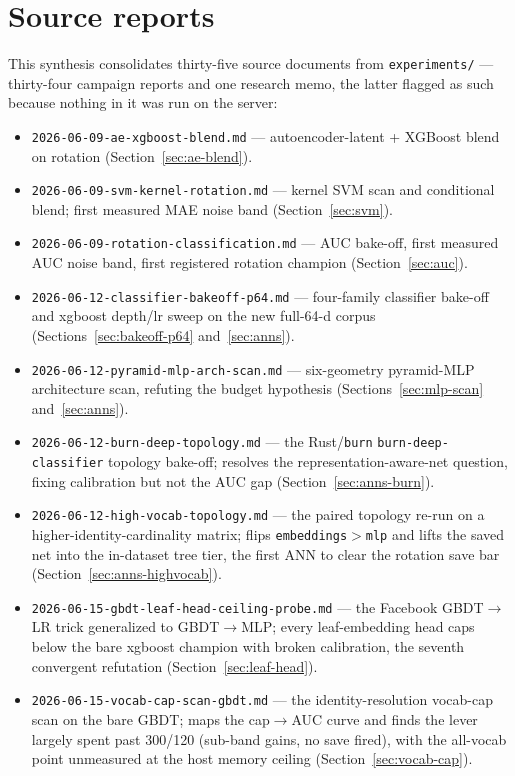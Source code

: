 \documentclass[11pt]{article}
\begin{document}
\section{Source reports}
This synthesis consolidates thirty-five source documents from \texttt{experiments/}
--- thirty-four campaign reports and one research memo, the latter flagged as such
because nothing in it was run on the server:
\begin{itemize}
  \item \texttt{2026-06-09-ae-xgboost-blend.md} --- autoencoder-latent +
    XGBoost blend on rotation (Section~\ref{sec:ae-blend}).
  \item \texttt{2026-06-09-svm-kernel-rotation.md} --- kernel SVM scan and
    conditional blend; first measured MAE noise band (Section~\ref{sec:svm}).
  \item \texttt{2026-06-09-rotation-classification.md} --- AUC bake-off, first
    measured AUC noise band, first registered rotation champion
    (Section~\ref{sec:auc}).
  \item \texttt{2026-06-12-classifier-bakeoff-p64.md} --- four-family
    classifier bake-off and xgboost depth/lr sweep on the new full-64-d corpus
    (Sections~\ref{sec:bakeoff-p64} and~\ref{sec:anns}).
  \item \texttt{2026-06-12-pyramid-mlp-arch-scan.md} --- six-geometry
    pyramid-MLP architecture scan, refuting the budget hypothesis
    (Sections~\ref{sec:mlp-scan} and~\ref{sec:anns}).
  \item \texttt{2026-06-12-burn-deep-topology.md} --- the Rust/\texttt{burn}
    \texttt{burn-deep-classifier} topology bake-off; resolves the
    representation-aware-net question, fixing calibration but not the AUC gap
    (Section~\ref{sec:anns-burn}).
  \item \texttt{2026-06-12-high-vocab-topology.md} --- the paired topology
    re-run on a higher-identity-cardinality matrix; flips
    \texttt{embeddings}$>$\texttt{mlp} and lifts the saved net into the
    in-dataset tree tier, the first ANN to clear the rotation save bar
    (Section~\ref{sec:anns-highvocab}).
  \item \texttt{2026-06-15-gbdt-leaf-head-ceiling-probe.md} --- the Facebook
    GBDT$\to$LR trick generalized to GBDT$\to$MLP; every leaf-embedding head
    caps below the bare xgboost champion with broken calibration, the seventh
    convergent refutation (Section~\ref{sec:leaf-head}).
  \item \texttt{2026-06-15-vocab-cap-scan-gbdt.md} --- the identity-resolution vocab-cap scan on the bare GBDT; maps the cap$\to$AUC curve and finds the lever largely spent past 300/120 (sub-band gains, no save fired), with the all-vocab point unmeasured at the host memory ceiling (Section~\ref{sec:vocab-cap}).

\end{itemize}
\end{document}

